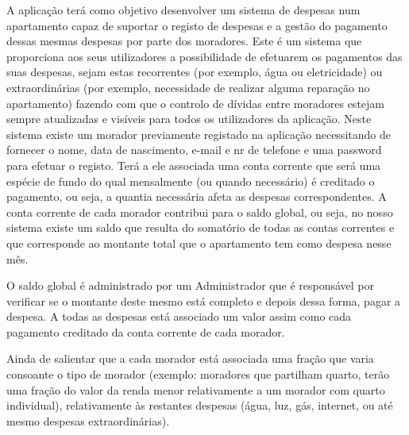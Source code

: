 A aplicação terá como objetivo desenvolver um sistema de despesas num apartamento  capaz de suportar o registo de despesas e a gestão do pagamento dessas mesmas despesas por parte dos moradores. Este é um sistema que proporciona aos seus utilizadores a possibilidade de efetuarem os pagamentos das suas despesas, sejam estas recorrentes (por exemplo, água ou eletricidade) ou extraordinárias (por exemplo, necessidade de realizar alguma reparação no apartamento) fazendo com que o controlo de dívidas entre moradores estejam sempre atualizadas e visíveis para todos os utilizadores da aplicação. 	
Neste sistema existe um morador previamente registado na aplicação necessitando de fornecer o nome, data de nascimento, e-mail e nr de telefone e uma password para efetuar o registo. Terá a ele associada uma conta corrente que será uma espécie de fundo do qual mensalmente (ou quando necessário) é creditado o pagamento, ou seja, a quantia necessária afeta as despesas correspondentes. A conta corrente de cada morador contribui para o saldo global, ou seja, no nosso sistema existe um saldo que resulta do somatório de todas as contas correntes e que corresponde ao montante total que o apartamento tem como despesa nesse mês. 

O saldo global é administrado por um Administrador que é responsável por verificar se o montante deste mesmo está completo e depois dessa forma, pagar a despesa. A todas as despesas está associado um valor assim como cada pagamento creditado da conta corrente de cada morador. 

Ainda de salientar que a cada morador está associada uma fração que varia consoante o tipo de morador (exemplo: moradores que partilham quarto, terão uma fração do valor da renda menor relativamente a um morador com quarto individual), relativamente às restantes despesas (água, luz, gás, internet, ou até mesmo despesas extraordinárias). 


 	